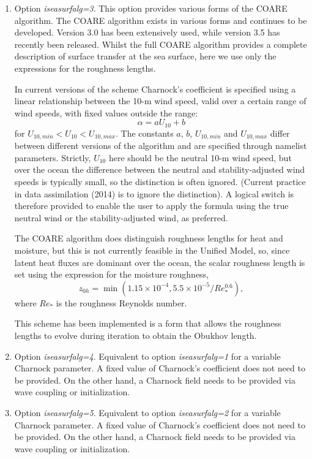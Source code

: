 \documentclass{UMDP_article}
\begin{document}
\begin{enumerate}
\item Option {\sl iseasurfalg=3}. This option provides various forms
  of the COARE algorithm. The COARE algorithm exists in various forms
  and continues to be developed. Version 3.0 \cite[]{fairall2003} has
  been extensively used, while version 3.5 \cite[]{edson2013} has
  recently been released.  Whilst the full COARE algorithm provides a
  complete description of surface transfer at the sea surface, here we
  use only the expressions for the roughness lengths.

  In current versions of the scheme Charnock's coefficient is
  specified using a linear relationship between the 10-m wind speed,
  valid over a certain range of wind speeds, with fixed values outside
  the range:
  \begin{equation}
    \alpha = a U_{10} +b
    \label{eq:charn}
  \end{equation}
  for $U_{10,min} < U_{10} < U_{10,max}$. The constants $a$, $b$,
  $U_{10,min}$ and $U_{10,max}$ differ between different versions of
  the algorithm and are specified through namelist
  parameters. Strictly, $U_{10}$ here should be the neutral 10-m wind
  speed, but over the ocean the difference between the neutral and
  stability-adjusted wind speeds is typically small, so the
  distinction is often ignored. (Current practice in data assimilation
  (2014) is to ignore the distinction). A logical switch is therefore
  provided to enable the user to apply the formula using the true
  neutral wind or the stability-adjusted wind, as preferred.

  The COARE algorithm does distinguish roughness lengths for heat and
  moisture, but this is not currently feasible in the Unified Model,
  so, since latent heat fluxes are dominant over the ocean, the scalar
  roughness length is set using the expression for the moisture
  roughness,
  \begin{equation}
    z_{0h} = \min(1.15\times 10^{-4}, 5.5\times 10^{-5}/Re_*^{0.6}),
    \label{eq:z0h_coare}
  \end{equation}
  where $Re_*$ is the roughness Reynolds number.

  This scheme has been implemented is a form that allows the roughness
  lengths to evolve during iteration to obtain the Obukhov length.

\item Option {\sl iseasurfalg=4}.  Equivalent to option {\sl iseasurfalg=1}
  for a variable Charnock parameter. A fixed value of Charnock's coefficient
  does not need to be provided. On the other hand, a Charnock field needs
  to be provided via wave coupling or initialization. 

\item Option {\sl iseasurfalg=5}.  Equivalent to option {\sl iseasurfalg=2}
  for a variable Charnock parameter. A fixed value of Charnock's coefficient
  does not need to be provided. On the other hand, a Charnock field needs
  to be provided via wave coupling or initialization.

\end{enumerate}
\end{document}
